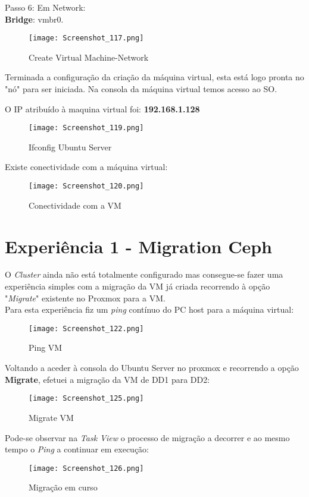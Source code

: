 Passo 6: Em Network:\\
\textbf{Bridge}: vmbr0.
\begin{figure}[H]
\center
\texttt{[image: Screenshot\_117.png]}
\caption{Create Virtual Machine-Network}
\end{figure}

Terminada a configuração da criação da máquina virtual, esta está logo pronta no "nó" para ser iniciada.
Na consola da máquina virtual temos acesso ao \ac{SO}.

\newpage
O \ac{IP} atribuído à maquina virtual foi: \textbf{192.168.1.128}
\begin{figure}[H]
\center
\texttt{[image: Screenshot\_119.png]}
\caption{Ifconfig Ubuntu Server}
\end{figure}

Existe conectividade com a máquina virtual:
\begin{figure}[H]
\center
\texttt{[image: Screenshot\_120.png]}
\caption{Conectividade com a VM}
\end{figure}

\newpage
\section{Experiência 1 - Migration Ceph}
O \textit{Cluster} ainda não está totalmente configurado mas consegue-se fazer uma experiência simples com a migração da \ac{VM} já criada recorrendo à opção "\textit{Migrate}" existente no Proxmox para a \ac{VM}.\\
\indent Para esta experiência fiz um \textit{ping} contínuo do \ac{PC} host para a máquina virtual:

\begin{figure}[H]
\center
\texttt{[image: Screenshot\_122.png]}
\caption{Ping VM}
\end{figure}

Voltando a aceder à consola do Ubuntu Server no proxmox e recorrendo a opção \textbf{Migrate}, efetuei a migração da \ac{VM} de DD1 para DD2:

\begin{figure}[H]
\center
\texttt{[image: Screenshot\_125.png]}
\caption{Migrate VM}
\end{figure}

\newpage
Pode-se observar na \textit{Task View} o processo de migração a decorrer e ao mesmo tempo o \textit{Ping} a continuar em execução:

\begin{figure}[H]
\center
\texttt{[image: Screenshot\_126.png]}
\caption{Migração em curso}
\end{figure}

